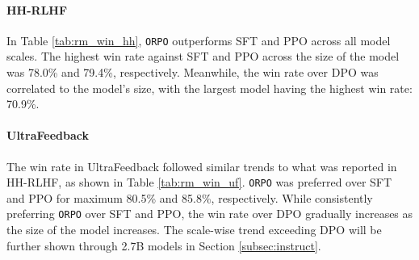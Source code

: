 \paragraph{HH-RLHF} In Table \ref{tab:rm_win_hh}, \texttt{ORPO} outperforms SFT and PPO across all model scales. The highest win rate against SFT and PPO across the size of the model was 78.0\% and 79.4\%, respectively. Meanwhile, the win rate over DPO was correlated to the model's size, with the largest model having the highest win rate: 70.9\%. 

\begin{table}[hbt!]
\caption{Average win rate (\%) and its standard deviation of \texttt{ORPO} and standard deviation over other methods on \textbf{HH-RLHF} dataset for three rounds. Sampling decoding with a temperature of 1.0 was used on the test set.}
\label{tab:rm_win_hh}
\end{table}

\paragraph{UltraFeedback} The win rate in UltraFeedback followed similar trends to what was reported in HH-RLHF, as shown in Table \ref{tab:rm_win_uf}. \texttt{ORPO} was preferred over SFT and PPO for maximum 80.5\% and 85.8\%, respectively. While consistently preferring \texttt{ORPO} over SFT and PPO, the win rate over DPO gradually increases as the size of the model increases. The scale-wise trend exceeding DPO will be further shown through 2.7B models in Section \ref{subsec:instruct}.
\begin{table}[hbt!]
\caption{Average win rate (\%) and its standard deviation of \texttt{ORPO} and standard deviation over other methods on \textbf{UltraFeedback} dataset for three rounds. Sampling decoding with a temperature of 1.0 was used.}
\label{tab:rm_win_uf}
\end{table}

